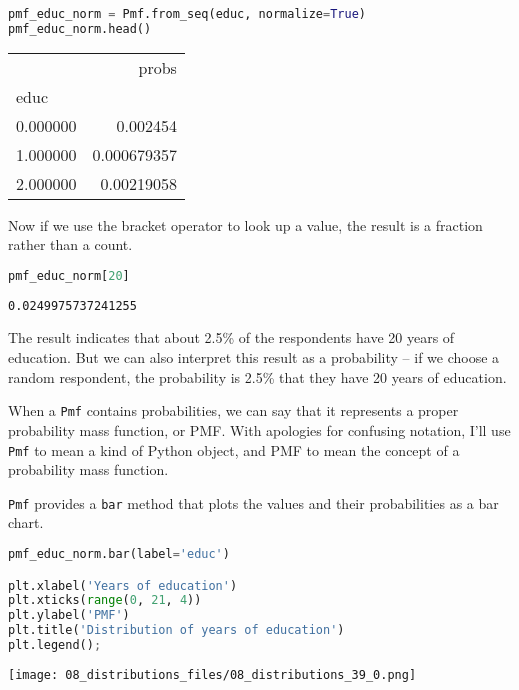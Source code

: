 \begin{lstlisting}[language=Python,style=source]
pmf_educ_norm = Pmf.from_seq(educ, normalize=True)
pmf_educ_norm.head()
\end{lstlisting}

\begin{tabular}{lr}
\midrule
 & probs \\
educ &  \\
\midrule
0.000000 & 0.002454 \\
1.000000 & 0.000679357 \\
2.000000 & 0.00219058 \\
\midrule
\end{tabular}

Now if we use the bracket operator to look up a value, the result is a
fraction rather than a count.

\begin{lstlisting}[language=Python,style=source]
pmf_educ_norm[20]
\end{lstlisting}

\begin{lstlisting}[style=output]
0.0249975737241255
\end{lstlisting}

The result indicates that about 2.5\% of the respondents have 20 years
of education. But we can also interpret this result as a probability --
if we choose a random respondent, the probability is 2.5\% that they
have 20 years of education.

When a \passthrough{\lstinline!Pmf!} contains probabilities, we can say
that it represents a proper probability mass function, or PMF. With
apologies for confusing notation, I'll use \passthrough{\lstinline!Pmf!}
to mean a kind of Python object, and PMF to mean the concept of a
probability mass function.

\passthrough{\lstinline!Pmf!} provides a \passthrough{\lstinline!bar!}
method that plots the values and their probabilities as a bar chart.

\begin{lstlisting}[language=Python,style=source]
pmf_educ_norm.bar(label='educ')

plt.xlabel('Years of education')
plt.xticks(range(0, 21, 4))
plt.ylabel('PMF')
plt.title('Distribution of years of education')
plt.legend();
\end{lstlisting}

\begin{center}
\texttt{[image: 08\_distributions\_files/08\_distributions\_39\_0.png]}
\end{center}

